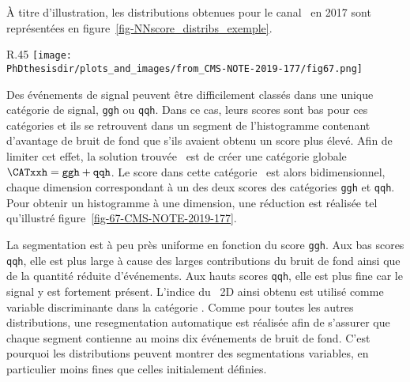 À titre d'illustration, les distributions obtenues pour le canal \ele\mu\ en 2017 sont représentées en figure~\ref{fig-NNscore_distribs_exemple}.
\begin{wrapfigure}{R}{.45\textwidth}
\centering
\texttt{[image: \\PhDthesisdir/plots\_and\_images/from\_CMS-NOTE-2019-177/fig67.png]}
\caption[Réduction à une dimension de la catégorie \CATxxh.]{Réduction à une dimension de la catégorie \CATxxh~\cite{CMS-NOTE-2019-177}.}
\label{fig-67-CMS-NOTE-2019-177}
\end{wrapfigure}
\par
Des événements de signal peuvent être difficilement classés dans une unique catégorie de signal, \texttt{ggh} ou \texttt{qqh}.
Dans ce cas, leurs scores sont bas pour ces catégories et ils
se retrouvent dans un segment de l'histogramme contenant d'avantage de bruit de fond
que s'ils avaient obtenu un score plus élevé.
Afin de limiter cet effet,
la solution trouvée~\cite{CMS-NOTE-2019-177} est de créer une catégorie globale $\CATxxh=\texttt{ggh} + \texttt{qqh}$.
Le score dans cette catégorie \CATxxh\ est alors bidimensionnel, chaque dimension correspondant à un des deux scores des catégories \texttt{ggh} et \texttt{qqh}.
Pour obtenir un histogramme à une dimension, une réduction est réalisée tel qu'illustré figure~\ref{fig-67-CMS-NOTE-2019-177}.
\par
La segmentation est à peu près uniforme en fonction du score \texttt{ggh}.
Aux bas scores \texttt{qqh}, elle est plus large à cause des larges contributions du bruit de fond ainsi que de la quantité réduite d'événements.
Aux hauts scores \texttt{qqh}, elle est plus fine car le signal y est fortement présent.
L'indice du \NNscore\ 2D ainsi obtenu est utilisé comme variable discriminante dans la catégorie \CATxxh.
Comme pour toutes les autres distributions, une resegmentation automatique est réalisée afin de s'assurer que chaque segment contienne au moins dix événements de bruit de fond.
C'est pourquoi les distributions peuvent montrer des segmentations variables, en particulier moins fines que celles initialement définies.
